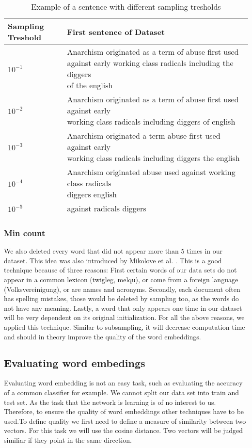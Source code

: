 \begin{table*}[tb]\centering
\caption{Example of a sentence with different sampling tresholds}
    \begin{tabular}{l l}%
        \toprule
Sampling Treshold & First sentence of Dataset \\ 
        \midrule%
$10^{-1}$ & \makecell[l]{Anarchism originated as a term of abuse first used against early working class radicals including the diggers\\ of the english} \\ \hline
$10^{-2}$  & \makecell[l]{ Anarchism originated as a term of abuse first used against early \\ working class radicals including diggers of english} \\ \hline
$10^{-3}$ & \makecell[l]{Anarchism originated a term abuse first used against early \\ working class radicals including diggers the english}\\ \hline
$10^{-4}$ &\makecell[l]{ Anarchism originated abuse used against working class radicals\\ diggers english} \\ \hline
$10^{-5}$ & against radicals diggers \\ \hline        
        \midrule%
   \end{tabular}%
\label{table:treshold_examples}
\end{table*}
\fi


\subsubsection{Min count}
We also deleted every word that did not appear more than 5 times in our dataset. This idea was also introduced by Mikolove et al. \citep{mikolov2}. This is a good technique because of three reasons: First certain words of our data sets do not appear in a common lexicon (twigleg, melqu), or come from a foreign language (Volksvereinigung), or are names and acronyms. Secondly, each document often has spelling mistakes, those would be deleted by sampling too, as the words do not have any meaning. Lastly, a word that only appears one time in our dataset will be very dependent on its original initialization. For all the above reasons, we applied this technique. Similar to subsampling, it will decrease computation time and  should in theory improve the quality of the word embeddings.

\subsection{Evaluating word embedings}
Evaluating word embedding is not an easy task, such as evaluating the accuracy of a common classifier for example. We cannot split our data set into train and test set. As the task that the network is learning is of no interest to us. Therefore, to ensure the quality of word embeddings other techniques have to be used.To define quality we first need to define a measure of similarity between two vectors. For this task we will use the cosine distance. Two vectors will be judged similiar if they point in the same direction. 


